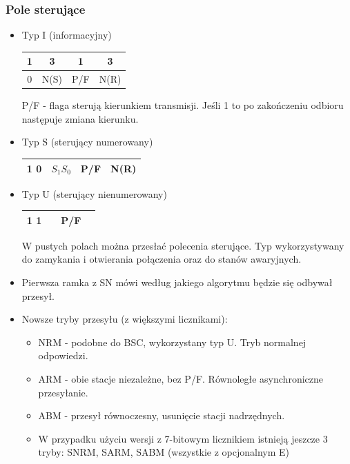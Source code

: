 			\subsubsection{Pole sterujące}
				\begin{itemize}
					\item Typ I (informacyjny)\\
					\begin{table}[h]
						\begin{tabular}{cccc}
							1                       & 3                         & 1                     & 3                         \\ \hline
							\multicolumn{1}{|c|}{0} & \multicolumn{1}{c|}{N(S)} & \multicolumn{1}{c|}{P/F} & \multicolumn{1}{c|}{N(R)} \\ \hline
						\end{tabular}
					\end{table}
					P/F - flaga sterują kierunkiem transmisji. Jeśli 1 to po zakończeniu odbioru następuje zmiana kierunku.
					\item Typ S (sterujący numerowany) \\
					\begin{table}[h]
						\begin{tabular}{cccc} \hline
							\multicolumn{1}{|c|}{1 0} & \multicolumn{1}{c|}{$ S_{1} S_{0} $} & \multicolumn{1}{c|}{P/F} & \multicolumn{1}{c|}{N(R)} \\ \hline
						\end{tabular}
					\end{table}
					\item Typ U (sterujący nienumerowany)\\
					\begin{table}[h]
						\begin{tabular}{cccc} \hline
							\multicolumn{1}{|c|}{1 1} & \multicolumn{1}{c|}{} & \multicolumn{1}{c|}{P/F} & \multicolumn{1}{c|}{} \\ \hline
						\end{tabular}
					\end{table}
					W pustych polach można przesłać polecenia sterujące. Typ wykorzystywany do zamykania i otwierania połączenia oraz do stanów awaryjnych.
					\item Pierwsza ramka z SN mówi według jakiego algorytmu będzie się odbywał przesył.\\
					\item Nowsze tryby przesyłu (z większymi licznikami):
					\begin{itemize}
						\item NRM - podobne do BSC, wykorzystany typ U. Tryb normalnej odpowiedzi.
						\item ARM - obie stacje niezależne, bez P/F. Równoległe asynchroniczne przesyłanie.
						\item ABM - przesył równoczesny, usunięcie stacji nadrzędnych.
						\item W przypadku użyciu wersji z 7-bitowym licznikiem istnieją jeszcze 3 tryby: SNRM, SARM, SABM (wszystkie z opcjonalnym E)
					\end{itemize}
				\end{itemize}

